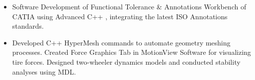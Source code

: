 \documentclass[10pt,a4paper,ragged2e,withhyper]{altacv}
\begin{document}
\begin{paracol}{2}
\switchcolumn
{}




\begin{itemize}
\item Software Development of Functional Tolerance \& Annotations Workbench of CATIA using Advanced C++ , integrating the latest ISO Annotations standards.
\end{itemize}

\divider

\begin{itemize}
\item Developed C++ HyperMesh commands to automate geometry meshing processes. Created Force Graphics Tab in MotionView Software for visualizing tire forces. Designed two-wheeler dynamics models and conducted stability analyses using MDL.
\end{itemize}

\divider


\end{paracol}
\end{document}
